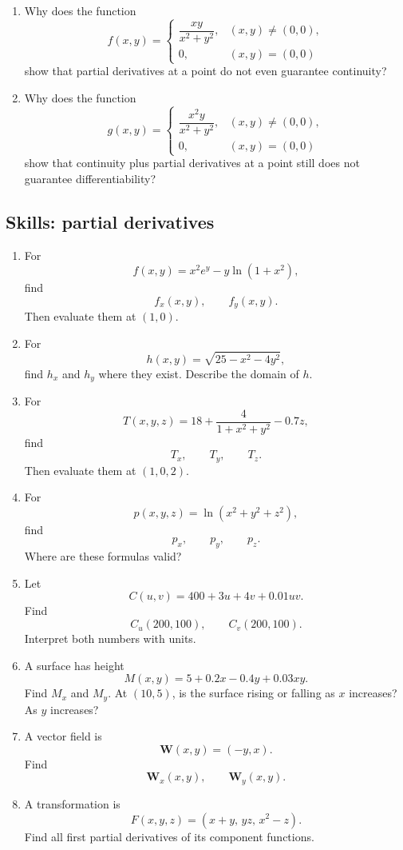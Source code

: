 \begin{enumerate}
\item Why does the function
\[
    f(x,y)=
    \begin{cases}
    \dfrac{xy}{x^2+y^2}, & (x,y)\ne(0,0),\\[2mm]
    0, & (x,y)=(0,0)
    \end{cases}
\]
show that partial derivatives at a point do not even guarantee continuity?

\item Why does the function
\[
    g(x,y)=
    \begin{cases}
    \dfrac{x^2y}{x^2+y^2}, & (x,y)\ne(0,0),\\[2mm]
    0, & (x,y)=(0,0)
    \end{cases}
\]
show that continuity plus partial derivatives at a point still does not guarantee
differentiability?
\end{enumerate}

\subsection*{Skills: partial derivatives}

\begin{enumerate}
\item For
\[
    f(x,y)=x^2e^y-y\ln(1+x^2),
\]
find
\[
    f_x(x,y),\qquad f_y(x,y).
\]
Then evaluate them at \((1,0)\).

\item For
\[
    h(x,y)=\sqrt{25-x^2-4y^2},
\]
find \(h_x\) and \(h_y\) where they exist.  Describe the domain of \(h\).

\item For
\[
    T(x,y,z)=18+\frac{4}{1+x^2+y^2}-0.7z,
\]
find
\[
    T_x,\qquad T_y,\qquad T_z.
\]
Then evaluate them at \((1,0,2)\).

\item For
\[
    p(x,y,z)=\ln(x^2+y^2+z^2),
\]
find
\[
    p_x,\qquad p_y,\qquad p_z.
\]
Where are these formulas valid?

\item Let
\[
    C(u,v)=400+3u+4v+0.01uv.
\]
Find
\[
    C_u(200,100),
    \qquad
    C_v(200,100).
\]
Interpret both numbers with units.

\item A surface has height
\[
    M(x,y)=5+0.2x-0.4y+0.03xy.
\]
Find \(M_x\) and \(M_y\).  At \((10,5)\), is the surface rising or falling as \(x\)
increases?  As \(y\) increases?

\item A vector field is
\[
    \mathbf W(x,y)=(-y,x).
\]
Find
\[
    \mathbf W_x(x,y),
    \qquad
    \mathbf W_y(x,y).
\]

\item A transformation is
\[
    F(x,y,z)=
    \left(
        x+y,\,
        yz,\,
        x^2-z
    \right).
\]
Find all first partial derivatives of its component functions.
\end{enumerate}

